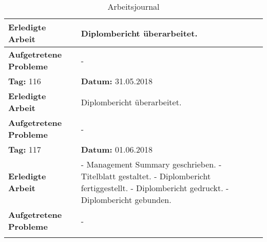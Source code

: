 \begin{longtable}{|p{5cm}|p{5cm}p{6cm}|}
\textbf{Erledigte Arbeit} & \multicolumn{2}{p{11cm}|}{Diplombericht überarbeitet.} \\ \hline
\textbf{Aufgetretene Probleme} & \multicolumn{2}{p{11cm}|}{-} \\ \hline
\rowcolor{heading}\textbf{Tag:} 116 & \textbf{Datum:} 31.05.2018 & \\ \hline
\textbf{Erledigte Arbeit} & \multicolumn{2}{p{11cm}|}{Diplombericht überarbeitet.} \\ \hline
\textbf{Aufgetretene Probleme} & \multicolumn{2}{p{11cm}|}{-} \\ \hline
\rowcolor{heading}\textbf{Tag:} 117 & \textbf{Datum:} 01.06.2018 & \\ \hline
\textbf{Erledigte Arbeit} & \multicolumn{2}{p{11cm}|}{- Management Summary geschrieben. \newline
- Titelblatt gestaltet. \newline
- Diplombericht fertiggestellt. \newline
- Diplombericht gedruckt. \newline
- Diplombericht gebunden.} \\ \hline
\textbf{Aufgetretene Probleme} & \multicolumn{2}{p{11cm}|}{-} \\ \hline
\caption{Arbeitsjournal}\\
\end{longtable}


